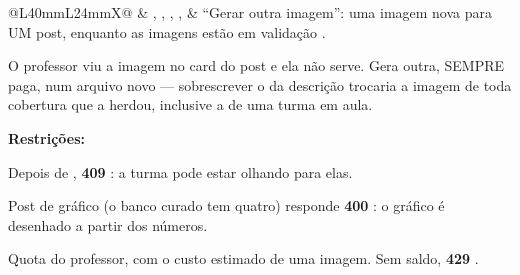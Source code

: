 \begin{tabularx}{\linewidth}{@{}L{40mm}L{24mm}X@{}}
\zebra {} & , , , ,  & \enquote{Gerar outra imagem}: uma imagem nova para UM post, enquanto as imagens estão em validação .\par O professor viu a imagem no card do post e ela não serve. Gera outra, SEMPRE paga, num arquivo novo --- sobrescrever o da descrição trocaria a imagem de toda cobertura que a herdou, inclusive a de uma turma em aula.\par \textbf{Restrições:}\par \hspace*{1em}\textbullet{} Depois de , \textbf{409} : a turma pode estar olhando para elas.\par \hspace*{1em}\textbullet{} Post de gráfico (o banco curado tem quatro) responde \textbf{400} : o gráfico é desenhado a partir dos números.\par \hspace*{1em}\textbullet{} Quota do professor, com o custo estimado de uma imagem. Sem saldo, \textbf{429} .\\

\end{tabularx}
